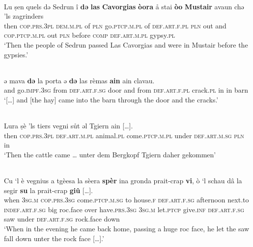 \ea\label{}
\\
\gll Lu ṣen quels də Sedrun î \textbf{də} \textbf{las} \textbf{Cavorgias} \textbf{òora} å stai \textbf{òo} \textbf{Mustair} avaun chə 'ls zagrinders \\
       then \textsc{cop.prs.3pl} \textsc{dem.m.pl} of \textsc{pln} go.\textsc{ptcp.m.pl} of \textsc{def.art.f.pl} \textsc{pln} out and \textsc{cop.ptcp.m.pl} out \textsc{pln} before \textsc{comp} \textsc{def.art.m.pl} gypsy.\textsc{pl}\\
\glt `Then the people of Sedrun passed Las Cavorgias and were in  Mustair before the gypsies.' %
\z

\ea\label{}
\\
\gll […] ǝ mava \textbf{dǝ} la porta ǝ \textbf{dǝ} las rèmas \textbf{ain} ain clavau.\\
     […] and go.\textsc{impf.3sg} from \textsc{def.art.f.sg} door and from \textsc{def.art.f.pl} crack.\textsc{pl} in in barn \\
\glt `[…] and [the hay] came into the barn through the door and the cracks.'
\z

\ea\label{}
\\
      \gll Lura ṣè 'ls tiers vegni sůt ǝl Tgiern ain […].\\
     then \textsc{cop.prs.3pl} \textsc{def.art.m.pl} animal.\textsc{pl} come.\textsc{ptcp.m.pl} under \textsc{def.art.m.sg} \textsc{pln} in\\
\glt `Then the cattle came  … unter dem Bergkopf Tgiern daher gekommen'
\z


\ea\label{}
\\
\gll Cu ‘l è vegnius a tgèesa la sèera \textbf{spèr} ina gronda prait-crap \textbf{vi}, ò ‘l schau dâ la segir \textbf{su} la prait-crap \textbf{giů} […].\\ %
     when \textsc{3sg.m} \textsc{cop.prs.3sg} come.\textsc{ptcp.m.sg} to house.\textsc{f} \textsc{def.art.f.sg} afternoon next.to \textsc{indef.art.f.sg} big roc.face over have.\textsc{prs.3sg} \textsc{3sg.m} let.\textsc{ptcp} give.\textsc{inf} \textsc{def.art.f.sg} saw under \textsc{def.art.f.sg} rock.face down\\
\glt `When in the evening he came back home, passing a huge roc face, he let the saw fall down unter the rock face […].'
\z

